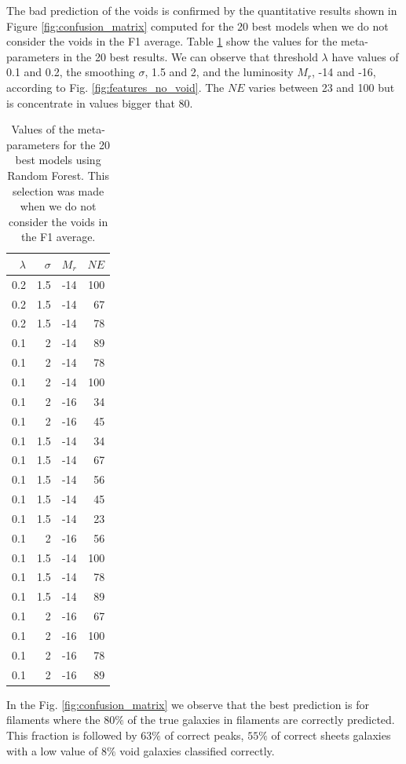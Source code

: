 \documentclass[usenatbib]{mnras}
\begin{document}
The bad prediction of the voids is confirmed by the quantitative results shown in Figure \ref{fig:confusion_matrix} computed for the 20 best models when we do not consider the voids in the F1 average. Table \ref{tab:models} show the values for the meta-parameters in the 20 best results. We can observe that threshold $\lambda$ have values of 0.1 and 0.2, the smoothing $\sigma$, 1.5 and 2, and the luminosity $M_r$, -14 and -16, according to Fig. \ref{fig:features_no_void}. The $NE$ varies between 23 and 100 but is concentrate in values bigger that 80.
\begin{table}
\centering
\begin{tabular}{rrrr}
\hline
   $\lambda$ &   $\sigma$ &   $M_r$ &   $NE$ \\
\hline
         0.2 &        1.5 &     -14 &    100 \\
         0.2 &        1.5 &     -14 &     67 \\
         0.2 &        1.5 &     -14 &     78 \\
         0.1 &        2   &     -14 &     89 \\
         0.1 &        2   &     -14 &     78 \\
         0.1 &        2   &     -14 &    100 \\
         0.1 &        2   &     -16 &     34 \\
         0.1 &        2   &     -16 &     45 \\
         0.1 &        1.5 &     -14 &     34 \\
         0.1 &        1.5 &     -14 &     67 \\
         0.1 &        1.5 &     -14 &     56 \\
         0.1 &        1.5 &     -14 &     45 \\
         0.1 &        1.5 &     -14 &     23 \\
         0.1 &        2   &     -16 &     56 \\
         0.1 &        1.5 &     -14 &    100 \\
         0.1 &        1.5 &     -14 &     78 \\
         0.1 &        1.5 &     -14 &     89 \\
         0.1 &        2   &     -16 &     67 \\
         0.1 &        2   &     -16 &    100 \\
         0.1 &        2   &     -16 &     78 \\
         0.1 &        2   &     -16 &     89 \\
\hline
\end{tabular}
\caption{Values of the meta-parameters for the 20 best models using Random Forest. This selection was made when we do not consider the voids in the F1 average.}
\label{tab:models}
\end{table}
In the Fig. \ref{fig:confusion_matrix} we observe that the best prediction is for filaments where the $80\%$ of the true galaxies in filaments are correctly predicted. 
This fraction is followed by $63\%$ of correct peaks, $55\%$ of correct   sheets galaxies with a low value of $8\%$ void galaxies classified correctly.
\end{document}
